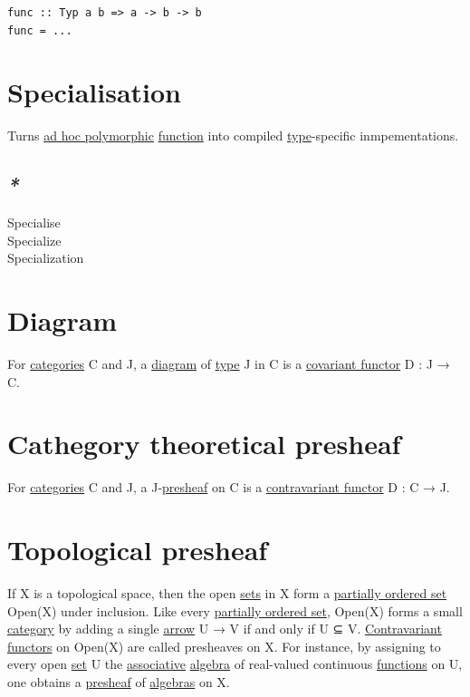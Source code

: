 \documentclass[a4paper,14pt,oneside]{book}
\begin{document}
{\begin{verbatim}
func :: Typ a b => a -> b -> b
func = ...
\end{verbatim}

\chapter{\label{org31ce122}Specialisation}
\label{sec:org87580a4}
Turns \hyperref[org32bb270]{ad hoc polymorphic} \hyperref[org6a60524]{function} into compiled \hyperref[orga9ca243]{type}-specific inmpementations.\\

\section{\emph{*}}
\label{sec:org950d7d1}

\label{org58a15dd}Specialise\\
\label{org9f53e9d}Specialize\\
\label{org7cd5a2a}Specialization\\

\chapter{\label{org3752ff7}Diagram}
\label{sec:org3d0ee20}

For \hyperref[org418901f]{categories} C and J, a \hyperref[org3752ff7]{diagram} of \hyperref[orga9ca243]{type} J in C is a \hyperref[org9a2347f]{covariant functor} D : J → C.\\

\chapter{Cathegory theoretical \label{orgd08d74e}presheaf}
\label{sec:orgc99a602}

For \hyperref[org418901f]{categories} C and J, a J-\hyperref[orgd08d74e]{presheaf} on C is a \hyperref[orgb8db9d4]{contravariant functor} D : C → J.\\

\chapter{Topological \label{org214eb02}presheaf}
\label{sec:org19648e9}

If X is a topological space, then the open \hyperref[org732f054]{sets} in X form a \hyperref[orge61ce13]{partially ordered set} Open(X) under inclusion. Like every \hyperref[orge61ce13]{partially ordered set}, Open(X) forms a small \hyperref[orgf2b19ad]{category} by adding a single \hyperref[org4ef5cf1]{arrow} U → V if and only if U ⊆ V. \hyperref[orgcf75a2e]{Contravariant} \hyperref[org4c9214f]{functors} on Open(X) are called presheaves on X. For instance, by assigning to every open \hyperref[org0726f94]{set} U the \hyperref[org3beb7c5]{associative} \hyperref[org8f571f3]{algebra} of real-valued continuous \hyperref[orgf33f5fb]{functions} on U, one obtains a \hyperref[orgd08d74e]{presheaf} of \hyperref[orga4fb878]{algebras} on X.\\

}
\end{document}
